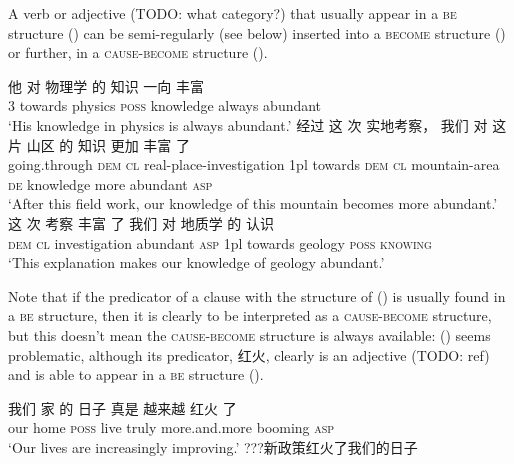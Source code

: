 \documentclass[UTF8, a4paper, oneside, scheme=plain, 12pt]{ctexrep}
\newcommand{\translate}[1]{`#1'}
\newcommand*{\category}[1]{\textsc{#1}}
\begin{document}
A verb or adjective (TODO: what category?) that usually appear in a \category{be} structure 
()
can be semi-regularly (see below) inserted into a \category{become} structure 
()
or further, in a \category{cause}-\category{become} structure 
().

\begin{exe}
    \ex\label{ex:verb-phrase.be-become.source-1} 
    \gll 他 对 物理学 的 知识 一向 丰富 \\
    3 towards physics \category{poss} knowledge always abundant \\
    \glt \translate{His knowledge in physics is always abundant.} 
    \ex\label{ex:verb-phrase.be-become.1} 
    \gll 经过 这 次 实地考察， 我们 对 这 片 山区 的 知识 更加 丰富 了 \\
    going.through \category{dem} \category{cl} real-place-investigation 
    1pl towards \category{dem} \category{cl} mountain-area \category{de} knowledge 
    more abundant \category{asp} \\
    \glt \translate{After this field work, our knowledge of this mountain 
    becomes more abundant.}
    \ex\label{ex:verb-phrase.be-become.cause-1}
    \gll 这 次 考察 丰富 了 我们 对 地质学 的 认识 \\
    \category{dem} \category{cl} investigation abundant \category{asp} 1pl towards geology \category{poss} \category{knowing} \\ 
    \glt \translate{This explanation makes our knowledge of geology abundant.}
\end{exe}

Note that if the predicator of 
a clause with the structure of ()
is usually found in a \category{be} structure, 
then it is clearly to be interpreted as a \category{cause}-\category{become} structure, 
but this doesn't mean the \category{cause}-\category{become} structure
is always available: 
() seems problematic,
although its predicator, 红火, clearly is an adjective (TODO: ref)
and is able to appear in a \category{be} structure 
().

\begin{exe}
    \ex\label{ex:verb-phrase.be-become.2} 
    \gll 我们 家 的 日子 真是 越来越 红火 了 \\
    our home \category{poss} live truly more.and.more booming \category{asp} \\
    \glt \translate{Our lives are increasingly improving.}
    \ex\label{ex:verb-phrase.be-become.cause-2} ???新政策红火了我们的日子
\end{exe}
\end{document}
